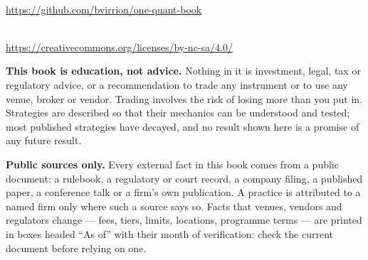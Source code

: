 \thispagestyle{empty}
\vspace*{\fill}
\begin{center}
\omcolophonsource\\[2pt]
\url{https://github.com/bvirrion/one-quant-book}

\bigskip
\omcolophonlicense\\[2pt]
\url{https://creativecommons.org/licenses/by-nc-sa/4.0/}\\[6pt]
\omcolophoncredit
\end{center}
\bigskip
\noindent\textbf{This book is education, not advice.} Nothing in it is
investment, legal, tax or regulatory advice, or a recommendation to trade any
instrument or to use any venue, broker or vendor. Trading involves the risk of
losing more than you put in. Strategies are described so that their mechanics
can be understood and tested; most published strategies have decayed, and no
result shown here is a promise of any future result.

\medskip
\noindent\textbf{Public sources only.} Every external fact in this book comes
from a public document: a rulebook, a regulatory or court record, a company
filing, a published paper, a conference talk or a firm's own publication. A
practice is attributed to a named firm only where such a source says so.
Facts that venues, vendors and regulators change --- fees, tiers, limits,
locations, programme terms --- are printed in boxes headed ``As of'' with
their month of verification: check the current document before relying on one.
\vspace*{\fill}
\clearpage
